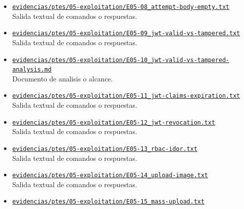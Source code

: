 \begin{itemize}[leftmargin=1.2em]
  {\small Documento de analisis o alcance.}
  \item \href{https://github.com/gamurigm/inventrack-ptes-report/blob/main/evidencias/ptes/05-exploitation/E05-08_attempt-body-empty.txt}{\nolinkurl{evidencias/ptes/05-exploitation/E05-08_attempt-body-empty.txt}}\\
  {\small Salida textual de comandos o respuestas.}
  \item \href{https://github.com/gamurigm/inventrack-ptes-report/blob/main/evidencias/ptes/05-exploitation/E05-09_jwt-valid-vs-tampered.txt}{\nolinkurl{evidencias/ptes/05-exploitation/E05-09_jwt-valid-vs-tampered.txt}}\\
  {\small Salida textual de comandos o respuestas.}
  \item \href{https://github.com/gamurigm/inventrack-ptes-report/blob/main/evidencias/ptes/05-exploitation/E05-10_jwt-valid-vs-tampered-analysis.md}{\nolinkurl{evidencias/ptes/05-exploitation/E05-10_jwt-valid-vs-tampered-analysis.md}}\\
  {\small Documento de analisis o alcance.}
  \item \href{https://github.com/gamurigm/inventrack-ptes-report/blob/main/evidencias/ptes/05-exploitation/E05-11_jwt-claims-expiration.txt}{\nolinkurl{evidencias/ptes/05-exploitation/E05-11_jwt-claims-expiration.txt}}\\
  {\small Salida textual de comandos o respuestas.}
  \item \href{https://github.com/gamurigm/inventrack-ptes-report/blob/main/evidencias/ptes/05-exploitation/E05-12_jwt-revocation.txt}{\nolinkurl{evidencias/ptes/05-exploitation/E05-12_jwt-revocation.txt}}\\
  {\small Salida textual de comandos o respuestas.}
  \item \href{https://github.com/gamurigm/inventrack-ptes-report/blob/main/evidencias/ptes/05-exploitation/E05-13_rbac-idor.txt}{\nolinkurl{evidencias/ptes/05-exploitation/E05-13_rbac-idor.txt}}\\
  {\small Salida textual de comandos o respuestas.}
  \item \href{https://github.com/gamurigm/inventrack-ptes-report/blob/main/evidencias/ptes/05-exploitation/E05-14_upload-image.txt}{\nolinkurl{evidencias/ptes/05-exploitation/E05-14_upload-image.txt}}\\
  {\small Salida textual de comandos o respuestas.}
  \item \href{https://github.com/gamurigm/inventrack-ptes-report/blob/main/evidencias/ptes/05-exploitation/E05-15_mass-upload.txt}{\nolinkurl{evidencias/ptes/05-exploitation/E05-15_mass-upload.txt}}\\

\end{itemize}
